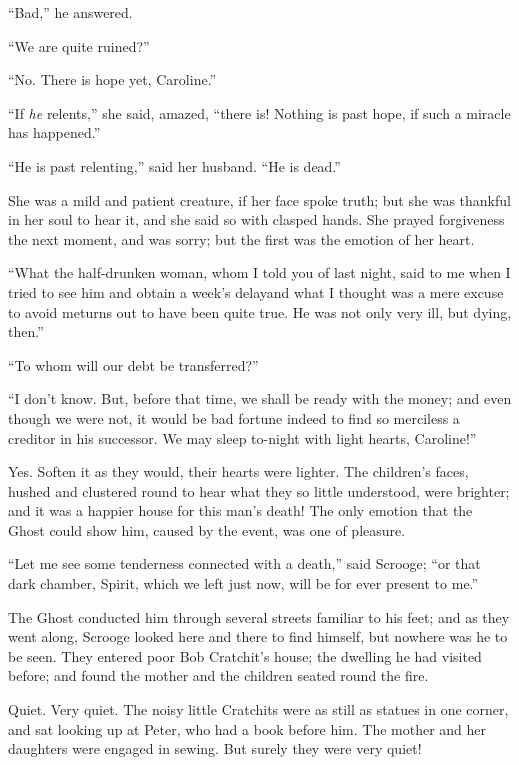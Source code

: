 \documentclass[paper=5.5in:8.5in,BCOR=7mm,twoside,DIV=calc,12pt,usegeometry]{scrbook} %
\begin{document}
\enquote{Bad,} he answered.

\enquote{We are quite ruined?}

\enquote{No. There is hope yet, Caroline.}

\enquote{If \textit{he} relents,} she said, amazed, \enquote{there is! Nothing is past hope, if such a miracle has happened.}

\enquote{He is past relenting,} said her husband. \enquote{He is dead.}

She was a mild and patient creature, if her face spoke truth; but she was thankful in her soul to hear it, and she said so with clasped hands. She prayed forgiveness the next moment, and was sorry; but the first was the emotion of her heart.

\enquote{What the half-drunken woman, whom I told you of last night, said to me when I tried to see him and obtain a week's delay\textemdash and what I thought was a mere excuse to avoid me\textemdash turns out to have been quite true. He was not only very ill, but dying, then.}

\enquote{To whom will our debt be transferred?}

\enquote{I don't know. But, before that time, we shall be ready with the money; and even though we were not, it would be bad fortune indeed to find so merciless a creditor in his successor. We may sleep to-night with light hearts, Caroline!}

Yes. Soften it as they would, their hearts were lighter. The children's faces, hushed and clustered round to hear what they so little understood, were brighter; and it was a happier house for this man's death! The only emotion that the Ghost could show him, caused by the event, was one of pleasure.

\enquote{Let me see some tenderness connected with a death,} said Scrooge; \enquote{or that dark chamber, Spirit, which we left just now, will be for ever present to me.}

The Ghost conducted him through several streets familiar to his feet; and as they went along, Scrooge looked here and there to find himself, but nowhere was he to be seen. They entered poor Bob Cratchit's house; the dwelling he had visited before; and found the mother and the children seated round the fire.

Quiet. Very quiet. The noisy little Cratchits were as still as statues in one corner, and sat looking up at Peter, who had a book before him. The mother and her daughters were engaged in sewing. But surely they were very quiet!
\end{document}

